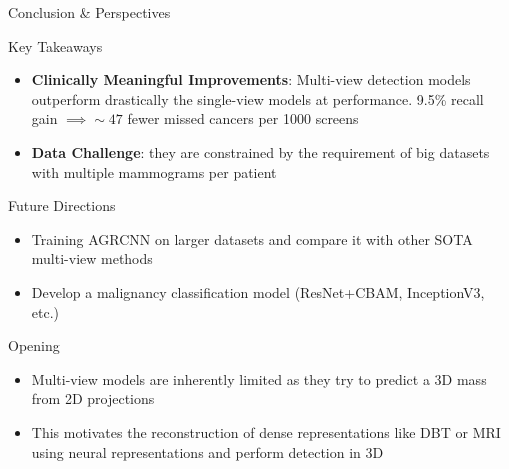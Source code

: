 \documentclass[8pt,aspectratio=169,xcolor=dvipsnames]{beamer}
\begin{document}
\begin{frame}{Conclusion \& Perspectives}
    
    \begin{block}{\color{white}Key Takeaways}
    \begin{itemize}
        \item \textbf{Clinically Meaningful Improvements}: Multi-view detection models outperform drastically the single-view models at performance. 9.5\% recall gain $\implies \sim47$ fewer missed cancers per 1000 screens
        \item \textbf{Data Challenge}: they are constrained by the requirement of big datasets with multiple mammograms per patient
    \end{itemize}
    \end{block}
    
    \vspace{0.3cm}
    
    \begin{block}{\color{white}Future Directions}
    \begin{itemize}
        \item Training AGRCNN on larger datasets and compare it with other SOTA multi-view methods
        \item Develop a malignancy classification model (ResNet+CBAM, InceptionV3, etc.)
    \end{itemize}
    \end{block}
    
    \vspace{0.3cm}
    
    \begin{alertblock}{\color{white}Opening}
    \begin{itemize}
        \item Multi-view models are inherently limited as they try to predict a 3D mass from 2D projections
        \item This motivates the reconstruction of dense representations like DBT or MRI using neural representations and perform detection in 3D
    \end{itemize}
        \end{alertblock}
\end{frame}
\end{document}
